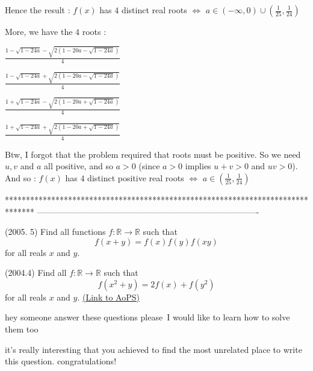 \begin{solution}
Hence the result : $ f(x)$ has $ 4$ distinct real roots $ \iff$ $ a\in( - \infty,0)\cup(\frac {1}{25},\frac {1}{24})$

More, we have the $ 4$ roots :

$ \frac {1 - \sqrt {1 - 24a} - \sqrt {2(1 - 20a - \sqrt {1 - 24a})}}{4}$

$ \frac {1 - \sqrt {1 - 24a} + \sqrt {2(1 - 20a - \sqrt {1 - 24a})}}{4}$

$ \frac {1 + \sqrt {1 - 24a} - \sqrt {2(1 - 20a + \sqrt {1 - 24a})}}{4}$

$ \frac {1 + \sqrt {1 - 24a} + \sqrt {2(1 - 20a + \sqrt {1 - 24a})}}{4}$

Btw, I forgot that the problem required that roots must be positive. So we need $ u,v$ and $ a$ all positive, and so $ a > 0$ (since $ a > 0$ implies $ u + v > 0$ and $ uv > 0$). And so :
$ f(x)$ has $ 4$ distinct positive real roots $ \iff$ $ a\in(\frac {1}{25},\frac {1}{24})$
\end{solution}
*******************************************************************************
-------------------------------------------------------------------------------

\begin{problem}
	(2005. 5) Find all functions $f: \mathbb R \to \mathbb R$ such that \[f(x+y)=f(x)f(y)f(xy)\] for all reals $x$ and $y$.

(2004.4) Find all $f: \mathbb R \to \mathbb R$ such that  \[f(x^2 + y) = 2 f(x) + f(y^2)\] for all reals $x$ and $y$.
	\flushright \href{https://artofproblemsolving.com/community/c6h282852}{(Link to AoPS)}
\end{problem}



\begin{solution}
	hey someone answer these questions please~I would like to learn how to solve them too
\end{solution}



\begin{solution}
	it's really interesting that you achieved to find the most unrelated place to write this question. congratulations!
\end{solution}



